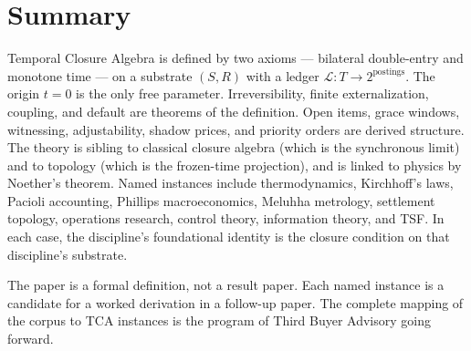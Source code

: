 \documentclass[11pt]{article}
\begin{document}
\section{Summary}

Temporal Closure Algebra is defined by two axioms — bilateral double-entry and monotone time — on a substrate $(S, R)$ with a ledger $\mathcal{L}: T \to 2^{\text{postings}}$. The origin $t = 0$ is the only free parameter. Irreversibility, finite externalization, coupling, and default are theorems of the definition. Open items, grace windows, witnessing, adjustability, shadow prices, and priority orders are derived structure. The theory is sibling to classical closure algebra (which is the synchronous limit) and to topology (which is the frozen-time projection), and is linked to physics by Noether's theorem. Named instances include thermodynamics, Kirchhoff's laws, Pacioli accounting, Phillips macroeconomics, Meluhha metrology, settlement topology, operations research, control theory, information theory, and TSF. In each case, the discipline's foundational identity is the closure condition on that discipline's substrate.

The paper is a formal definition, not a result paper. Each named instance is a candidate for a worked derivation in a follow-up paper. The complete mapping of the corpus to TCA instances is the program of Third Buyer Advisory going forward.
\end{document}
